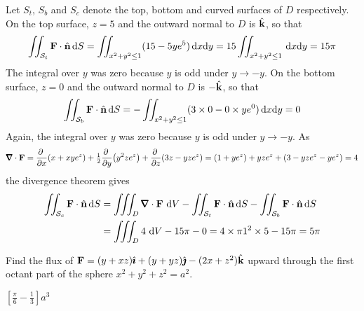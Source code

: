 \begin{solution} 
Let $S_t$, $S_b$ and $S_c$ denote the top, bottom and curved surfaces of
$D$ respectively. On the top surface, $z=5$ and 
the outward normal to $D$ is $\hat{\mathbf{k}}$, so that
$$
\iint_{\mathcal{S}_t}\mathbf{F}\cdot\hat{\mathbf{n}}\,\mathrm{d}S
=\iint_{x^2+y^2\le 1}(15-5ye^5)\,\mathrm{d}x\mathrm{d}y
=15\iint_{x^2+y^2\le 1}\,\mathrm{d}x\mathrm{d}y
=15\pi
$$
The integral over $y$ was zero because $y$ is odd under $y\rightarrow -y$.
On the bottom surface, $z=0$ and 
the outward normal to $D$ is $-\hat{\mathbf{k}}$, so that
$$
\iint_{\mathcal{S}_b}\mathbf{F}\cdot\hat{\mathbf{n}}\,\mathrm{d}S
=-\iint_{x^2+y^2\le 1}(3\times 0-0\times ye^0)\,\mathrm{d}x\mathrm{d}y
=0
$$
Again, the integral over $y$ was zero because $y$ is odd under 
$y\rightarrow -y$. As
$$
\vnabla\cdot\vF
=\pdiff{}{x}(x+xye^z)
+\half\pdiff{}{y}\big( y^2ze^z\big)
+\pdiff{}{z}(3z-yze^z)
=(1+ye^z)+yze^z+(3-yze^z-ye^z)
=4
$$
the divergence theorem gives
\begin{align*}
\dblInt_{\cS_c}\vF\cdot\hn\,\dee{S}
&=\tripInt_D\vnabla\cdot\vF\ \dee{V}
-\dblInt_{\cS_t}\vF\cdot\hn\,\dee{S}
-\dblInt_{\cS_b}\vF\cdot\hn\,\dee{S}\\
&=\tripInt_D4\ \dee{V}
-15\pi-0
=4\times\pi 1^2\times 5-15\pi
=5\pi
\end{align*}
\end{solution}

\begin{question}
Find the flux of $\mathbf{F}=(y+xz)\hat{\pmb{\imath}}+(y+yz)\hat{\pmb{\jmath}}-(2x+z^2)\hat{\mathbf{k}}$ upward
through the first octant part of the sphere $x^2+y^2+z^2=a^2$.
\end{question}

%

\begin{answer} 
$\left[\frac{\pi}{6}-\frac{1}{3}\right]a^3$
\end{answer}

